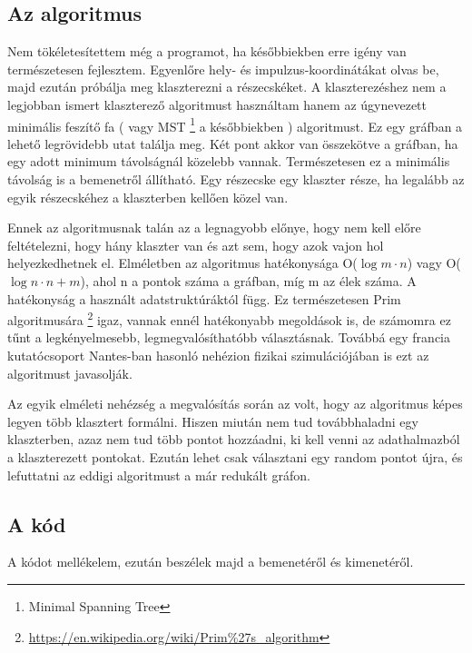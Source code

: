 \documentclass[a4paper,12pt]{article}
\begin{document}
\subsection{ Az algoritmus}
\par Nem tökéletesítettem még a programot, ha későbbiekben erre igény van természetesen fejlesztem. Egyenlőre hely- és impulzus-koordinátákat
olvas be, majd ezután próbálja meg klaszterezni a részecskéket. A klaszterezéshez nem a legjobban ismert klaszterező algoritmust
használtam hanem az úgynevezett minimális feszítő fa ( vagy MST \footnote{Minimal Spanning Tree} a későbbiekben ) algoritmust. Ez egy 
gráfban a lehető legrövidebb utat találja meg. Két pont akkor van összekötve a gráfban, ha egy adott minimum távolságnál közelebb vannak.
Természetesen ez a minimális távolság is a bemenetről állítható. Egy részecske egy klaszter része, ha legalább az egyik részecskéhez a
klaszterben kellően közel van. 
\par Ennek az algoritmusnak talán az a legnagyobb előnye, hogy nem kell előre feltételezni, hogy hány klaszter van és azt sem, hogy 
azok vajon hol helyezkedhetnek el. Elméletben az algoritmus hatékonysága O($\log{m}\cdot n$) vagy O($\log{n}\cdot n + m$), ahol n a pontok
száma a gráfban, míg m az élek száma. A hatékonyság a használt adatstruktúráktól függ. Ez természetesen Prim algoritmusára \footnote{\url{https://en.wikipedia.org/wiki/Prim\%27s_algorithm}}
igaz, vannak ennél hatékonyabb megoldások is, de számomra ez tűnt a legkényelmesebb, legmegvalósíthatóbb választásnak. Továbbá egy francia 
kutatócsoport Nantes-ban hasonló nehézion fizikai szimulációjában is ezt az algoritmust javasolják.
\par  Az egyik elméleti nehézség a megvalósítás során az volt, hogy az algoritmus képes legyen több klasztert formálni. Hiszen miután 
nem tud továbbhaladni egy klaszterben, azaz nem tud több pontot hozzáadni, ki kell venni az adathalmazból a klaszterezett pontokat. Ezután lehet csak választani egy random pontot újra, és lefuttatni az eddigi algoritmust a már redukált gráfon.
\subsection{ A kód}
\par A kódot mellékelem, ezután beszélek majd a bemenetéről és kimenetéről.

\end{document}
